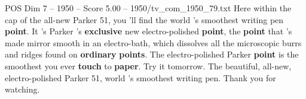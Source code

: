\begin{textsample}{POS Dim 7 – 1950 – Score 5.00 – 1950/tv\_com\_1950\_79.txt}  \label{ex:f7_pos_002}
Here within the cap of the all-new Parker 51, you 'll find the world 's smoothest writing pen \textbf{point}.
It 's Parker 's \textbf{exclusive} new electro-polished \textbf{point}, the \textbf{point} that 's made mirror smooth in an electro-bath, which dissolves all the microscopic burrs and ridges found on \textbf{ordinary} \textbf{points}.
The electro-polished Parker \textbf{point} is the smoothest you ever \textbf{touch} to \textbf{paper}.
Try it tomorrow.
The beautiful, all-new, electro-polished Parker 51, world 's smoothest writing pen.
Thank you for watching.

\end{textsample}

